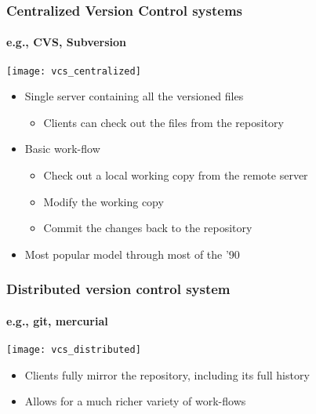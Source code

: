 \documentclass[9pt]{beamer}
\begin{document}
\begin{frame}
  \frametitle{Centralized Version Control systems}
  \framesubtitle{e.g., CVS, Subversion}
  \centering\texttt{[image: vcs\_centralized]}

  \begin{itemize}
  \item Single server containing all the versioned files
    \begin{itemize}
    \item Clients can check out the files from the repository
    \end{itemize}
  \item Basic work-flow
    \begin{itemize}
    \item Check out a local working copy from the remote server
    \item Modify the working copy
    \item Commit the changes back to the repository
    \end{itemize}
  \item Most popular model through most of the '90
  \end{itemize}
\end{frame}


\begin{frame}
  \frametitle{Distributed version control system}
  \framesubtitle{e.g., git, mercurial}
  \centering\texttt{[image: vcs\_distributed]}

  \begin{itemize}
  \item Clients fully mirror the repository, including its full history
  \item Allows for a much richer variety of work-flows
  \end{itemize}
\end{frame}
\end{document}
